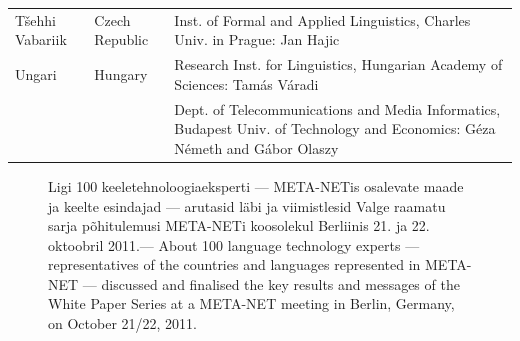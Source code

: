 \begin{longtable}{llp{105mm}}
\addlinespace 
  Tšehhi Vabariik & \textcolor{grey1}{Czech Republic} & Inst. of Formal and Applied Linguistics, Charles Univ. in Prague: Jan Hajic \\ \addlinespace
  Ungari & \textcolor{grey1}{Hungary} & Research Inst. for Linguistics, Hungarian Academy of Sciences: Tamás Váradi\\  \addlinespace
  & & Dept. of Telecommunications and Media Informatics, Budapest Univ. of Technology and Economics: Géza Németh and Gábor Olaszy\\
\end{longtable}
\normalsize

\renewcommand*{\figureformat}{}
\renewcommand*{\captionformat}{}

\begin{figure}[htbp]
  \center
  \caption{Ligi 100 keeletehnoloogiaeksperti --- META-NETis osalevate maade ja keelte esindajad --- arutasid läbi ja viimistlesid Valge raamatu sarja põhitulemusi META-NETi koosolekul Berliinis 21. ja 22. oktoobril 2011.--- \textcolor{grey1}{About 100 language technology experts --- representatives of the countries and languages represented in META-NET --- discussed and finalised the key results and messages of the White Paper Series at a META-NET meeting in Berlin, Germany, on October 21/22, 2011.}}
\end{figure}

\cleardoublepage

\label{whitepaperseries}

